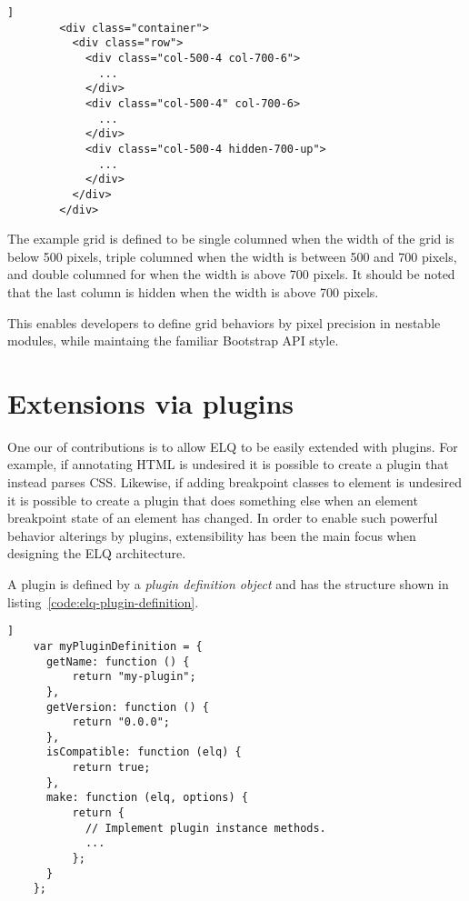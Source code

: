 \documentclass{acm_proc_article-sp}
\newcommand{\elq}{ELQ}
\begin{document}
      \begin{lstlisting}[gobble=8,caption={},captionpos=b,label={}]]
        <div class="container">
          <div class="row">
            <div class="col-500-4 col-700-6">
              ...
            </div>
            <div class="col-500-4" col-700-6>
              ...
            </div>
            <div class="col-500-4 hidden-700-up">
              ...
            </div>
          </div>
        </div>
      \end{lstlisting}

      The example grid is defined to be single columned when the width of the grid is below 500 pixels, triple columned when the width is between 500 and 700 pixels, and double columned for when the width is above 700 pixels.
      It should be noted that the last column is hidden when the width is above 700 pixels.

      This enables developers to define grid behaviors by pixel precision in nestable modules, while maintaing the familiar Bootstrap API style.

\section{Extensions via plugins}
  One our of contributions is to allow \elq{} to be easily extended with plugins.
  For example, if annotating HTML is undesired it is possible to create a plugin that instead parses CSS.
  Likewise, if adding breakpoint classes to element is undesired it is possible to create a plugin that does something else when an element breakpoint state of an element has changed.
  In order to enable such powerful behavior alterings by plugins, extensibility has been the main focus when designing the \elq{} architecture.

  A plugin is defined by a \emph{plugin definition object} and has the structure shown in listing~\ref{code:elq-plugin-definition}.
  \begin{lstlisting}[gobble=4,caption={The structure of plugin definition objects.},captionpos=b,label={code:elq-plugin-definition}]]
    var myPluginDefinition = {
      getName: function () {
          return "my-plugin";
      },
      getVersion: function () {
          return "0.0.0";
      },
      isCompatible: function (elq) {
          return true;
      },
      make: function (elq, options) {
          return {
            // Implement plugin instance methods.
            ...
          };
      }
    };
  \end{lstlisting}
\end{document}
